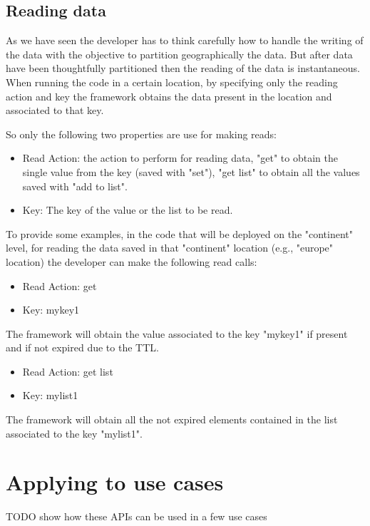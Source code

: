 \subsection{Reading data}
As we have seen the developer has to think carefully how to handle the writing of the data with the objective to partition geographically the data. But after data have been thoughtfully partitioned then the reading of the data is instantaneous.
When running the code in a certain location, by specifying only the reading action and key the framework obtains the data present in the location and associated to that key.

So only the following two properties are use for making reads:
\begin{itemize}
    \item Read Action: the action to perform for reading data, "get" to obtain the single value from the key (saved with "set"), "get list" to obtain all the values saved with "add to list".
    \item Key: The key of the value or the list to be read.
\end{itemize}

To provide some examples, in the code that will be deployed on the "continent" level, for reading the data saved in that "continent" location (e.g., "europe" location) the developer can make the following read calls:
\begin{example}
\begin{itemize}
    \item Read Action: get
    \item Key: mykey1
\end{itemize}
The framework will obtain the value associated to the key "mykey1" if present and if not expired due to the TTL.
\end{example}

\begin{example}
\begin{itemize}
    \item Read Action: get list
    \item Key: mylist1
\end{itemize}
The framework will obtain all the not expired elements contained in the list associated to the key "mylist1".
\end{example}


\section{Applying to use cases}
TODO show how these APIs can be used in a few use cases

